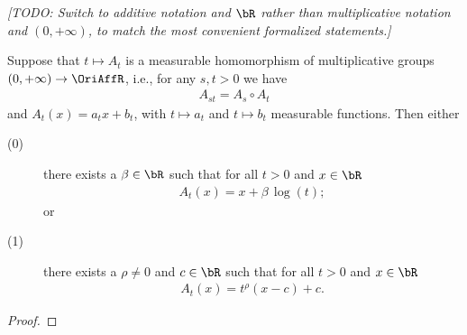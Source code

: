 \begin{theorem}
  \label{thm:one-parameter-subgroups-of-affine-isomorphisms}
  \leanok
  \emph{[TODO: Switch to additive notation and $\bR$ rather than multiplicative
  notation and $(0,+\infty)$, to match the most convenient formalized statements.]}

  Suppose that $t \mapsto A_t$ is a measurable homomorphism of multiplicative groups
  $(0,+\infty) \to \OriAffR$, i.e., for any $s, t > 0$ we have
  \begin{align*}
    A_{s t} = A_s \circ A_t
  \end{align*}
  and $A_t(x) = a_t x + b_t$, with $t \mapsto a_t$ and $t \mapsto b_t$
  measurable functions.
  Then either
  \begin{description}
    \item[(0)] there exists a $\beta \in \bR$ such that for all $t > 0$ and $x \in \bR$
      \begin{align*}
        A_t(x) = x + \beta \, \log(t) ;
      \end{align*}
      or
    \item[(1)] there exists a $\rho \ne 0$ and $c \in \bR$ such that
      for all $t > 0$ and $x \in \bR$
      \begin{align*}
        A_t(x) = t^{\rho} (x - c) + c .
      \end{align*}
  \end{description}
\end{theorem}
\begin{proof}
  \leanok
\end{proof}
